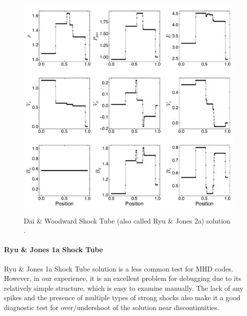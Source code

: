 \begin{figure}[ht!]
    \includegraphics[width=\linewidth]{assets/3-mhd-tests/d&w.pdf}
    \caption{Dai \& Woodward Shock Tube (also called Ryu \& Jones 2a) solution \citep{dai_woodward_1998, ryu_jones_1995}.
    }
    \label{fig:dai-and-woodward}
\end{figure}

\paragraph{Ryu \& Jones 1a Shock Tube}

Ryu \& Jones 1a Shock Tube solution \citep{ryu_jones_1995} is a less common test for MHD codes. However, in our experience, it is an excellent problem for debugging due to its relatively simple structure, which is easy to examine manually. The lack of any spikes and the presence of multiple types of strong shocks also make it a good diagnostic test for over/undershoot of the solution near discontinuities.

